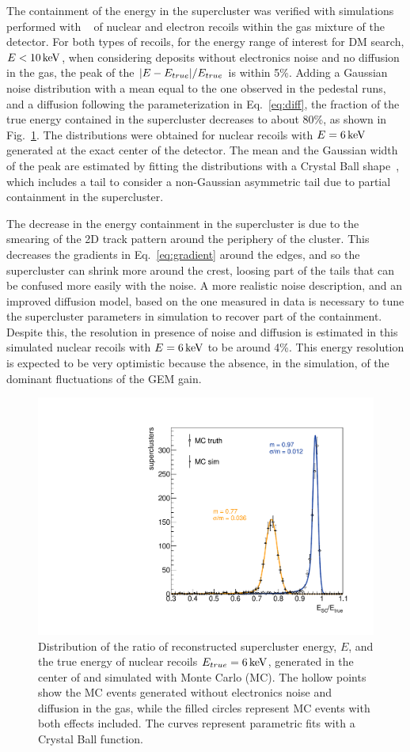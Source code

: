 The containment of the energy in the supercluster was verified
with simulations  performed with
\SRIM~\cite{bib:srim} of nuclear and electron recoils  within the gas mixture of the \lemon detector.
For both types of recoils, for the energy range of interest for DM
 search, \eg $E<10\,\textrm{ke\hspace{-.08em}V}$, when considering deposits without electronics
 noise and no diffusion in the gas, the peak of the
 $\vert E-E_{true} \vert/E_{true}$ is within 5\%. Adding a Gaussian noise
 distribution with a mean equal to the one observed in the pedestal
 runs, and a diffusion following the parameterization in
 Eq.~\ref{eq:diff}, the fraction of the true energy contained in the
 supercluster decreases to about 80\%, as shown in
 Fig.~\ref{fig:eoveretrue}. The distributions were obtained for
 nuclear recoils with $E=6\,\textrm{ke\hspace{-.08em}V}$ generated at the exact center of
 the \lemon detector. The mean and the Gaussian width of the peak are
 estimated by fitting the distributions with a Crystal Ball
 shape~\cite{Oreglia:1980cs,Gaiser:1982yw}, which includes a tail to
 consider a non-Gaussian asymmetric tail due to partial containment in
 the supercluster.

The decrease in the energy containment in the supercluster is due to
the smearing of the 2D track pattern around the periphery of the
cluster.  This decreases the gradients in Eq.~\ref{eq:gradient} around
the edges, and so the supercluster can shrink more around the crest,
loosing part of the tails that can be confused more easily with the
noise.  A more realistic noise description, and an improved diffusion
model, based on the one measured in data is necessary to tune the
supercluster parameters in simulation to recover part of the
containment. Despite this, the resolution in presence of noise and
diffusion is estimated in this simulated nuclear recoils with
$E=6\,\textrm{ke\hspace{-.08em}V}$ to be around 4\%. This energy resolution is expected to be
very optimistic because the absence, in the simulation, of the
dominant fluctuations of the GEM gain.
%
\begin{figure}[ht]
  \begin{center} \includegraphics[width=0.49\linewidth]{figures/eoveretrue}
   \caption{Distribution of the ratio of reconstructed supercluster
    energy, $E$, and the true energy of nuclear recoils
    $E_{true}=6\,\textrm{ke\hspace{-.08em}V}$, generated in the center of \lemon and simulated
    with \GEANTfour Monte Carlo (MC). The hollow points show the MC
    events generated without electronics noise and diffusion in the
    gas, while the filled circles represent MC events with both
    effects included. The curves represent parametric fits with a
    Crystal Ball function.\label{fig:eoveretrue}}
  \end{center}
\end{figure}
%

